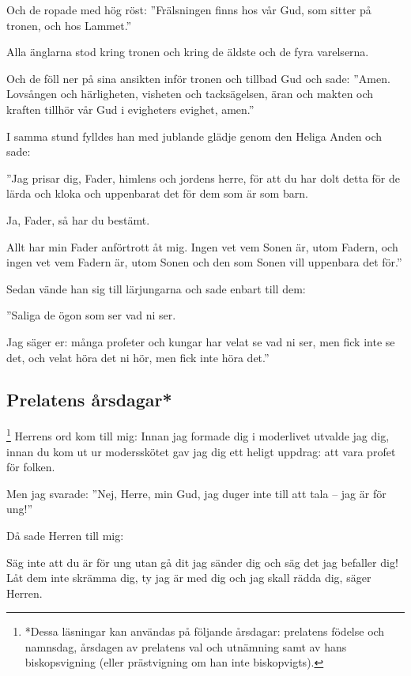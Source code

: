 Och de ropade med hög röst: ''Frälsningen finns hos vår Gud, som sitter på tronen, och hos Lammet.''

Alla änglarna stod kring tronen och kring de äldste och de fyra varelserna. 

Och de föll ner på sina ansikten inför tronen och tillbad Gud
och sade: ''Amen. Lovsången och härligheten, visheten och tacksägelsen, äran och makten och kraften tillhör vår Gud i evigheters evighet, amen.''


{I samma stund fylldes han med jublande glädje genom den Heliga Anden och sade: }

''Jag prisar dig, Fader, himlens och jordens herre, för att du har dolt detta för de lärda och kloka och uppenbarat det för dem som är som barn. 

Ja, Fader, så har du bestämt.

Allt har min Fader anförtrott åt mig. Ingen vet vem Sonen är, utom Fadern, och ingen vet vem Fadern är, utom Sonen och den som Sonen vill uppenbara det för.''

Sedan vände han sig till lärjungarna och sade enbart till dem: 

''Saliga de ögon som ser vad ni ser.

Jag säger er: många profeter och kungar har velat se vad ni ser, men fick inte se det, och velat höra det ni hör, men fick inte höra det.''

\newpage
\subsection[Prelatens årsdagar]{Prelatens årsdagar*}
{\let\thefootnote\relax\footnote{*Dessa läsningar kan användas på följande årsdagar: prelatens födelse och namnsdag, årsdagen av prelatens val och utnämning samt av hans biskopsvigning (eller prästvigning om han inte biskopvigts).}}
{Herrens ord kom till mig:}
Innan jag formade dig i moderlivet
utvalde jag dig,
innan du kom ut ur modersskötet
gav jag dig ett heligt uppdrag:
att vara profet för folken.

Men jag svarade: ''Nej, Herre, min Gud, jag duger inte till att tala – jag är för ung!'' 

Då sade Herren till mig:

Säg inte att du är för ung
utan gå dit jag sänder dig
och säg det jag befaller dig!
Låt dem inte skrämma dig,
ty jag är med dig
och jag skall rädda dig,
säger Herren.


